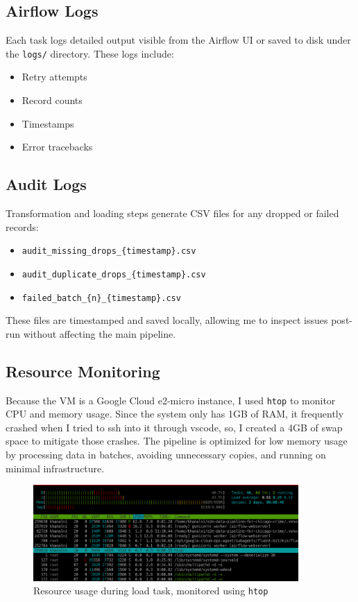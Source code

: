 \documentclass[12pt]{article}
\begin{document}
\subsection*{Airflow Logs}
Each task logs detailed output visible from the Airflow UI or saved to disk under the \texttt{logs/} directory. These logs include:
\begin{itemize}
    \item Retry attempts
    \item Record counts
    \item Timestamps
    \item Error tracebacks
\end{itemize}

\subsection*{Audit Logs}
Transformation and loading steps generate CSV files for any dropped or failed records:
\begin{itemize}
    \item \texttt{audit\_missing\_drops\_\{timestamp\}.csv}
    \item \texttt{audit\_duplicate\_drops\_\{timestamp\}.csv}
    \item \texttt{failed\_batch\_\{n\}\_\{timestamp\}.csv}
\end{itemize}

These files are timestamped and saved locally, allowing me to inspect issues post-run without affecting the main pipeline.

\subsection*{Resource Monitoring}
Because the VM is a Google Cloud e2-micro instance, I used \texttt{htop} to monitor CPU and memory usage. Since the system only has 1GB of RAM, it frequently crashed when I tried to ssh into it through vscode, so, I created a 4GB of swap space to mitigate those crashes. The pipeline is optimized for low memory usage by processing data in batches, avoiding unnecessary copies, and running on minimal infrastructure.

\begin{figure}[h!]
    \centering
    \includegraphics[width=0.9\textwidth]{figures/htop_during_load.png}
    \caption{Resource usage during load task, monitored using \texttt{htop}}
    \label{fig:htop}
\end{figure}
\end{document}
